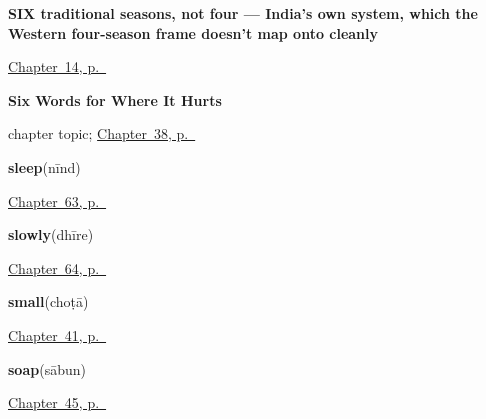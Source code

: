 \noindent\begin{minipage}[t]{\linewidth}
\raggedright
\textbf{SIX traditional seasons, not four — India's own  system, which the Western four-season frame doesn't map onto cleanly}\enspace\emph{     }\par
\footnotesize \hyperref[ch:hi-seasons]{Chapter~14, p.~\pageref*{ch:hi-seasons}}
\end{minipage}\par\smallskip

\noindent\begin{minipage}[t]{\linewidth}
\raggedright
\textbf{Six Words for Where It Hurts}\par
\footnotesize chapter topic; \hyperref[ch:hi-where-it-hurts]{Chapter~38, p.~\pageref*{ch:hi-where-it-hurts}}
\end{minipage}\par\smallskip

\noindent\begin{minipage}[t]{\linewidth}
\raggedright
\textbf{sleep}\enspace\emph{}\enspace(nīnd)\par
\footnotesize \hyperref[ch:hi-what-the-body-tells-you]{Chapter~63, p.~\pageref*{ch:hi-what-the-body-tells-you}}
\end{minipage}\par\smallskip

\noindent\begin{minipage}[t]{\linewidth}
\raggedright
\textbf{slowly}\enspace\emph{}\enspace(dhīre)\par
\footnotesize \hyperref[ch:hi-how-much-and-how-fast]{Chapter~64, p.~\pageref*{ch:hi-how-much-and-how-fast}}
\end{minipage}\par\smallskip

\noindent\begin{minipage}[t]{\linewidth}
\raggedright
\textbf{small}\enspace\emph{}\enspace(choṭā)\par
\footnotesize \hyperref[ch:hi-describing-things]{Chapter~41, p.~\pageref*{ch:hi-describing-things}}
\end{minipage}\par\smallskip

\noindent\begin{minipage}[t]{\linewidth}
\raggedright
\textbf{soap}\enspace\emph{}\enspace(sābun)\par
\footnotesize \hyperref[ch:hi-ask-for]{Chapter~45, p.~\pageref*{ch:hi-ask-for}}
\end{minipage}\par\smallskip

